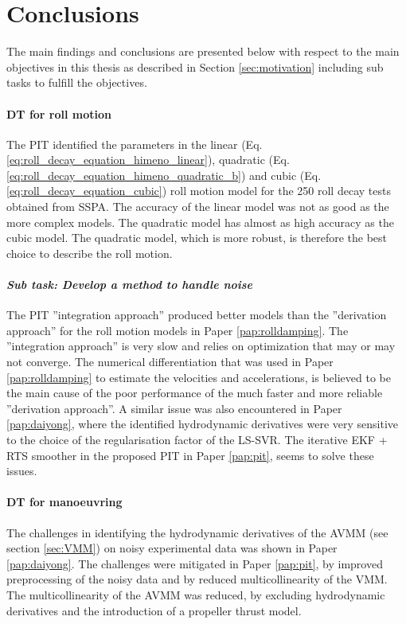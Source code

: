 \chapter{Conclusions\label{ch:conclusions}}
The main findings and conclusions are presented below with respect to the main objectives in this thesis as described in Section \ref{sec:motivation} including sub tasks to fulfill the objectives.

\subsubsection*{DT for roll motion}
The PIT identified the parameters in the linear (Eq.\ref{eq:roll_decay_equation_himeno_linear}), quadratic (Eq.\ref{eq:roll_decay_equation_himeno_quadratic_b}) and cubic (Eq.\ref{eq:roll_decay_equation_cubic}) roll motion model for the 250 roll decay tests obtained from SSPA. 
The accuracy of the linear model was not as good as the more complex models. The quadratic model has almost as high accuracy as the cubic model. The quadratic model, which is more robust, is therefore the best choice to describe the roll motion. 

\subsubsection*{\emph{Sub task: Develop a method to handle noise}}
The PIT ''integration approach'' produced better models than the ''derivation approach'' for the roll motion models in Paper \ref{pap:rolldamping}. The ''integration approach'' is very slow and relies on optimization that may or may not converge.
The numerical differentiation that was used in Paper \ref{pap:rolldamping} to estimate the velocities and accelerations, is believed to be the main cause of the poor performance of the much faster and more reliable ''derivation approach''. A similar issue was also encountered in Paper \ref{pap:daiyong}, where the identified hydrodynamic derivatives were very sensitive to the choice of the regularisation factor of the LS-SVR.
The iterative EKF + RTS smoother in the proposed PIT in Paper \ref{pap:pit}, seems to solve these issues.

\subsubsection*{DT for manoeuvring}
The challenges in identifying the hydrodynamic derivatives of the AVMM (see section \ref{sec:VMM}) on noisy experimental data was shown in Paper \ref{pap:daiyong}. The challenges were mitigated in Paper \ref{pap:pit}, by improved preprocessing of the noisy data and by reduced multicollinearity of the VMM. The multicollinearity of the AVMM was reduced, by excluding hydrodynamic derivatives and the introduction of a propeller thrust model.

